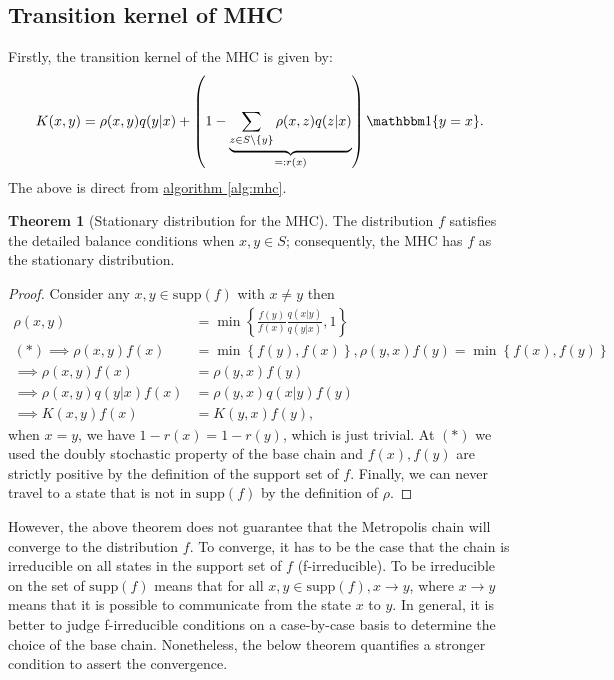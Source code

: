 \documentclass[]{article}
\theoremstyle{definition}
\newtheorem{theorem}{Theorem}       %
\begin{document}
    \subsection{Transition kernel of MHC}
        Firstly, the transition kernel of the MHC is given by: 
        \begin{align*}
            K(x, y) = 
            \rho(x, y)q(y|x) + 
            \left(
                1 - \underbrace{\sum_{z \in S\setminus \{y\} }^{}\rho(x, z)q(z|x)}_{=:r(x)}
            \right) \mathbbm 1\{y = x\}. 
        \end{align*}
        The above is direct from \hyperref[alg:mhc]{algorithm \ref*{alg:mhc}}. 
        \begin{theorem}[Stationary distribution for the MHC]\label{thm:sat_distr}
            The distribution $f$ satisfies the detailed balance conditions when $x, y\in S$; consequently, the MHC has $f$ as the stationary distribution. 
        \end{theorem}
        \begin{proof}
            Consider any $x, y\in \text{supp}(f)$ with $x\neq y$ then
            \begin{align*}
                \rho(x, y) &= \min\left\lbrace
                \frac{f(y)}{f(x)}\frac{q(x|y)}{q(y|x)}, 1
                \right\rbrace
                \\
                (*)\implies
                \rho(x, y)f(x) &= \min\left\lbrace
                    f(y), f(x)
                \right\rbrace, \rho(y, x) f(y) = 
                \min\left\lbrace
                    f(x), f(y)
                \right\rbrace
                \\
                \implies
                \rho(x, y)f(x) &= \rho(y, x)f(y)
                \\
                \implies
                \rho(x, y)q(y|x)f(x) &= 
                \rho(y, x)q(x|y)f(y)
                \\
                \implies
                K(x, y)f(x) &= K(y, x)f(y), 
            \end{align*}
            when $x = y$, we have $1 - r(x)= 1 - r(y)$, which is just trivial. At $(*)$ we used the doubly stochastic property of the base chain and $f(x), f(y)$ are strictly positive by the definition of the support set of $f$. Finally, we can never travel to a state that is not in $\text{supp}(f)$ by the definition of $\rho$. 
        \end{proof}
        However, the above theorem does not guarantee that the Metropolis chain will converge to the distribution $f$. To converge, it has to be the case that the chain is irreducible on all states in the support set of $f$ (f-irreducible). To be irreducible on the set of $\text{supp}(f)$ means that for all $x, y \in \text{supp}(f), x \rightarrow y$, where $x\rightarrow y$ means that it is possible to communicate from the state $x$ to $y$. In general, it is better to judge f-irreducible conditions on a case-by-case basis to determine the choice of the base chain. Nonetheless, the below theorem quantifies a stronger condition to assert the convergence. 
\end{document}
